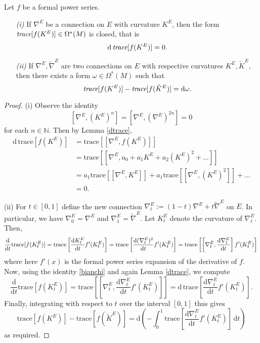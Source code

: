 \documentclass[a4paper,openany]{scrbook}
\newcommand{\ud}{\mathrm{d}}
\begin{document}
\begin{theorem}\label{cw}
Let $f$ be a formal power series.
\begin{itemize}
\item[\emph{(i)}] If $\nabla^E$ be a connection on $E$ with curvature $K^E$, then the form $\emph{trace}[f(K^E)]\in\Omega^*(M)$ is closed, that is
\begin{equation}
\ud\,\emph{trace}[f(K^E)]=0.
\end{equation}
\item[\emph{(ii)}] If $\nabla^E,\tilde{\nabla}^E$ are two connections on $E$ with respective curvatures $K^E,\tilde{K}^E$, then there exists a form $\omega\in\Omega^*(M)$ such that
\begin{equation}
\emph{trace}[f(K^E)]-\emph{trace}[f(\tilde{K}^E)]=\ud\omega.
\end{equation}
\end{itemize}
\end{theorem}
\begin{proof}
\noindent (i) Observe the identity
\begin{equation}\label{bianchi}
[\nabla^E,(K^E)^n]=[\nabla^E,(\nabla^E)^{2n}]=0
\end{equation}
for each $n\in\mathbb{N}$. Then by Lemma \ref{dtrace},
\begin{align*}
\ud\,\text{trace}[f(K^E)]&=\text{trace}[[\nabla^E,f(K^E)]]\\
&=\text{trace}[[\nabla^E,a_0+a_1K^E+a_2(K^E)^2+\dots]]\\
&=a_1\text{trace}[[\nabla^E,K^E]]+a_1\text{trace}[[\nabla^E,(K^E)^2]]+\dots\\
&=0.
\end{align*}

\noindent (ii) For $t\in[0,1]$ define the new connection $\nabla_t^E:=(1-t)\nabla^E+t\tilde{\nabla}^E$ on $E$. In particular, we have $\nabla_0^E=\nabla^E$ and $\nabla_1^E=\tilde{\nabla}^E$. Let $K_t^E$ denote the curvature of $\nabla_t^E$. Then, 
\begin{equation*}
\frac{\ud}{\ud t}\text{trace}[f(K_t^E)]=\text{trace}\left[\frac{\ud K_t^E}{\ud t} f'(K_t^E)\right]=\text{trace}\left[\frac{\ud(\nabla_t^E)^2}{\ud t}f'(K_t^E)\right]=\text{trace}\left[\left[\nabla_t^E,\frac{\ud\nabla_t^E}{\ud t}\right]f'(K_t^E)\right]\\
\end{equation*}
where here $f'(x)$ is the formal power series expansion of the derivative of $f$. Now, using the identity \eqref{bianchi} and again Lemma \ref{dtrace}, we compute
\begin{equation*}
\frac{\ud}{\ud t}\text{trace}[f(K_t^E)]=\text{trace}\left[\left[\nabla_t^E,\frac{\ud\nabla_t^E}{\ud t}f'(K_t^E)\right]\right]=\ud\,\text{trace}\left[\frac{\ud\nabla_t^E}{\ud t}f'(K_t^E)\right].
\end{equation*}
Finally, integrating with respect to $t$ over the interval $[0,1]$ thus gives
\begin{equation*}
\text{trace}[f(K^E)]-\text{trace}[f(\tilde{K}^E)]=\ud\left(-\int_0^1\text{trace}\left[\frac{\ud\nabla_t^E}{\ud t}f'(K_t^E)\right]\,\ud t\right)
\end{equation*}
as required.
\end{proof}
\end{document}
